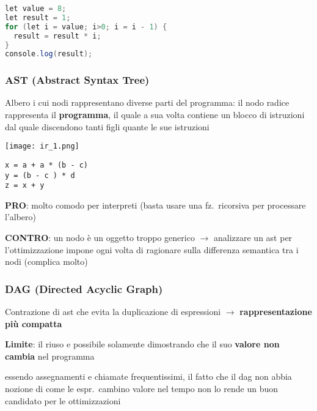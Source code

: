 \begin{lstlisting}[language=java]
let value = 8;
let result = 1;
for (let i = value; i>0; i = i - 1) {
  result = result * i;
}
console.log(result);\end{lstlisting}

\vspace{-.5em}
\subsubsection{AST (Abstract Syntax Tree)}

Albero i cui nodi rappresentano diverse parti del programma: il nodo radice rappresenta il \textbf{programma}, il quale a sua volta contiene un blocco di istruzioni dal quale discendono tanti figli quante le sue istruzioni

\vspace{1em}
\noindent\begin{minipage}[c]{.3\textwidth}
\texttt{[image: ir\_1.png]}
\end{minipage}\hfill
\begin{minipage}[c]{.67\textwidth}
\begin{lstlisting}[linewidth=.5\linewidth]
x = a + a * (b - c)
y = (b - c ) * d
z = x + y\end{lstlisting}
\textbf{PRO}: molto comodo per interpreti (basta usare una fz.~ricorsiva per processare l'albero)

\textbf{CONTRO}: un nodo \`e un oggetto troppo generico $\rightarrow$ analizzare un ast per l'ottimizzazione impone ogni volta di ragionare sulla differenza semantica tra i nodi (complica molto)
\end{minipage}


\vspace{-.5em}
\subsubsection{DAG (Directed Acyclic Graph)}

Contrazione di ast che evita la duplicazione di espressioni $\rightarrow$ \textbf{rappresentazione pi\`u compatta}

\noindent\textbf{Limite}: il riuso e possibile solamente dimostrando che il suo \textbf{valore non cambia} nel programma
\begin{emphasize}
  essendo assegnamenti e chiamate frequentissimi, il fatto che il dag non abbia nozione di come le espr.~cambino valore nel tempo non lo rende un buon candidato per le ottimizzazioni
\end{emphasize}

